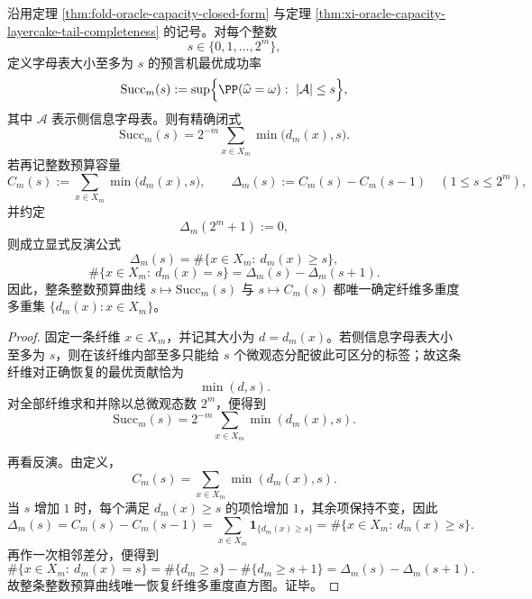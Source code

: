 \begin{theorem}[全整数预算采样下的预言机成功率闭式与多重度直方图可逆性]\label{thm:xi-oracle-capacity-full-budget-discrete-inversion}
沿用定理 \ref{thm:fold-oracle-capacity-closed-form} 与定理 \ref{thm:xi-oracle-capacity-layercake-tail-completeness} 的记号。对每个整数
\[
s\in\{0,1,\dots,2^m\},
\]
定义字母表大小至多为 \(s\) 的预言机最优成功率
\[
\mathrm{Succ}_m(s):=
\sup\Bigl\{\PP(\widehat\omega=\omega):\ |\mathcal A|\le s\Bigr\},
\]
其中 \(\mathcal A\) 表示侧信息字母表。则有精确闭式
\[
\boxed{\;
\mathrm{Succ}_m(s)
=
2^{-m}\sum_{x\in X_m}\min\bigl(d_m(x),s\bigr).\;}
\]
若再记整数预算容量
\[
C_m(s):=\sum_{x\in X_m}\min\bigl(d_m(x),s\bigr),
\qquad
\Delta_m(s):=C_m(s)-C_m(s-1)\quad(1\le s\le 2^m),
\]
并约定
\[
\Delta_m(2^m+1):=0,
\]
则成立显式反演公式
\[
\boxed{\;
\Delta_m(s)=\#\{x\in X_m:\ d_m(x)\ge s\},\;}
\]
\[
\boxed{\;
\#\{x\in X_m:\ d_m(x)=s\}
=
\Delta_m(s)-\Delta_m(s+1).\;}
\]
因此，整条整数预算曲线 \(s\mapsto \mathrm{Succ}_m(s)\) 与 \(s\mapsto C_m(s)\) 都唯一确定纤维多重度多重集 \(\{d_m(x):x\in X_m\}\)。
\end{theorem}
\begin{proof}
固定一条纤维 \(x\in X_m\)，并记其大小为 \(d=d_m(x)\)。若侧信息字母表大小至多为 \(s\)，则在该纤维内部至多只能给 \(s\) 个微观态分配彼此可区分的标签；故这条纤维对正确恢复的最优贡献恰为
\[
\min(d,s).
\]
对全部纤维求和并除以总微观态数 \(2^m\)，便得到
\[
\mathrm{Succ}_m(s)=2^{-m}\sum_{x\in X_m}\min(d_m(x),s).
\]

再看反演。由定义，
\[
C_m(s)=\sum_{x\in X_m}\min(d_m(x),s).
\]
当 \(s\) 增加 \(1\) 时，每个满足 \(d_m(x)\ge s\) 的项恰增加 \(1\)，其余项保持不变，因此
\[
\Delta_m(s)
=
C_m(s)-C_m(s-1)
=
\sum_{x\in X_m}\mathbf 1_{\{d_m(x)\ge s\}}
=
\#\{x\in X_m:\ d_m(x)\ge s\}.
\]
再作一次相邻差分，便得到
\[
\#\{x\in X_m:\ d_m(x)=s\}
=
\#\{d_m\ge s\}-\#\{d_m\ge s+1\}
=
\Delta_m(s)-\Delta_m(s+1).
\]
故整条整数预算曲线唯一恢复纤维多重度直方图。证毕。
\end{proof}

